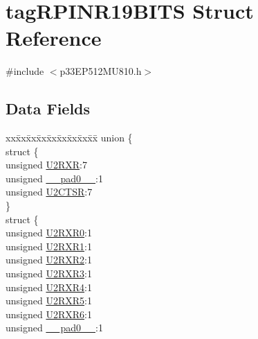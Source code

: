 \hypertarget{structtag_r_p_i_n_r19_b_i_t_s}{}\section{tag\+R\+P\+I\+N\+R19\+B\+I\+TS Struct Reference}
\label{structtag_r_p_i_n_r19_b_i_t_s}


{\ttfamily \#include $<$p33\+E\+P512\+M\+U810.\+h$>$}

\subsection*{Data Fields}
\begin{DoxyCompactItemize}
\item 
\begin{tabbing}
xx\=xx\=xx\=xx\=xx\=xx\=xx\=xx\=xx\=\kill
union \{\\
\>struct \{\\
\>\>unsigned \hyperlink{structtag_r_p_i_n_r19_b_i_t_s_aefdc297c8b8fcb3aa6d620a108024ae1}{U2RXR}:7\\
\>\>unsigned \hyperlink{structtag_r_p_i_n_r19_b_i_t_s_adf71f3d8410c1f1dbbc96680a92c49af}{\_\_pad0\_\_}:1\\
\>\>unsigned \hyperlink{structtag_r_p_i_n_r19_b_i_t_s_aaab9f787dc07c0a7f9d28c12e763c1c0}{U2CTSR}:7\\
\>\} \\
\>struct \{\\
\>\>unsigned \hyperlink{structtag_r_p_i_n_r19_b_i_t_s_abb2be25bec43fa5fc0c640140eee2cce}{U2RXR0}:1\\
\>\>unsigned \hyperlink{structtag_r_p_i_n_r19_b_i_t_s_aadea070b94d198c0e5c53761e120744b}{U2RXR1}:1\\
\>\>unsigned \hyperlink{structtag_r_p_i_n_r19_b_i_t_s_abf4fc131892611fe2838d0ce3a827a22}{U2RXR2}:1\\
\>\>unsigned \hyperlink{structtag_r_p_i_n_r19_b_i_t_s_aeb5b39476160f7c2f5eb3ce67d150a06}{U2RXR3}:1\\
\>\>unsigned \hyperlink{structtag_r_p_i_n_r19_b_i_t_s_aaee14fb4808c8aa8ed6df36eddad0f95}{U2RXR4}:1\\
\>\>unsigned \hyperlink{structtag_r_p_i_n_r19_b_i_t_s_ac294463c8df79a6517df436ab9a0857b}{U2RXR5}:1\\
\>\>unsigned \hyperlink{structtag_r_p_i_n_r19_b_i_t_s_a4e7eca3f0bcb416ff645f151381ea171}{U2RXR6}:1\\
\>\>unsigned \hyperlink{structtag_r_p_i_n_r19_b_i_t_s_adf71f3d8410c1f1dbbc96680a92c49af}{\_\_pad0\_\_}:1\\

\end{tabbing}
\end{DoxyCompactItemize}
